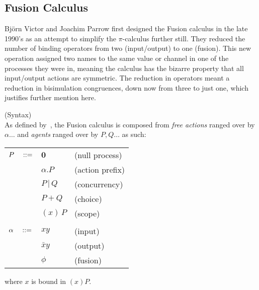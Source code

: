 \subsection{Fusion Calculus}

    Bj{\"o}rn Victor and Joachim Parrow first designed the Fusion calculus in the late 1990's as an attempt to simplify the $\pi$-calculus further still.
    They reduced the number of binding operators from two (input/output) to one (fusion).
    This new operation assigned two names to the same value or channel in one of the processes they were in, meaning the calculus has the bizarre property that all input/output actions are symmetric.
    The reduction in operators meant a reduction in bisimulation congruences, down now from three to just one, which justifies further mention here.
    
    \begin{definition}{(Syntax)\\}
        As defined by~\cite{fusion-calculus}, the Fusion calculus is composed from \textit{free actions} ranged over by $\alpha \ldots$ and \textit{agents} ranged over by $P, Q \ldots$ as such:
        \begin{center}
            \begin{tabular}{ l l l }
                $P \quad ::=$    & $\textbf{0}$      & (null process) \\
                                    & $\alpha . P$      & (action prefix) \\
                                    & $P \, | \, Q$     & (concurrency) \\
                                    & $P + Q$           & (choice) \\
                                    & $(x) \, P$        & (scope) \\ \\

                $\alpha \quad ::=$   & $x y$         & (input) \\
                                        & $\bar{x} y$   & (output) \\
                                        & $\phi$        & (fusion) \\
            \end{tabular}
        \end{center}
        where $x$ is bound in $(x)P$.
    \end{definition}


